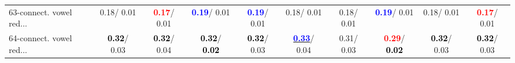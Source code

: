 \begin{table}[h]
\begin{center}
{\begin{tabular}{lc|c|c|c|c|c|c|c|c}
63-connect. vowel red... &   0.18/  0.01 & \textcolor{red}{\textbf{  0.17}}/  0.01 & \textcolor{blue}{\textbf{  0.19}}/  0.01 & \textcolor{blue}{\textbf{  0.19}}/  0.01 &   0.18/  0.01 &   0.18/  0.01 & \textcolor{blue}{\textbf{  0.19}}/  0.01 &   0.18/  0.01 & \textcolor{red}{\textbf{  0.17}}/  0.01 \\
64-connect. vowel red... & \textcolor{black}{\textbf{  0.32}}/  0.03 & \textcolor{black}{\textbf{  0.32}}/  0.04 & \textcolor{black}{\textbf{  0.32}}/\textcolor{black}{\textbf{  0.02}} & \textcolor{black}{\textbf{  0.32}}/  0.03 & \underline{\textcolor{blue}{\textbf{  0.33}}}/  0.04 &   0.31/  0.03 & \textcolor{red}{\textbf{  0.29}}/\textcolor{black}{\textbf{  0.02}} & \textcolor{black}{\textbf{  0.32}}/  0.03 & \textcolor{black}{\textbf{  0.32}}/  0.03 \\\end{tabular}}\label{stratsALCKappa1AllReduxalla}
\end{center}
\end{table}
